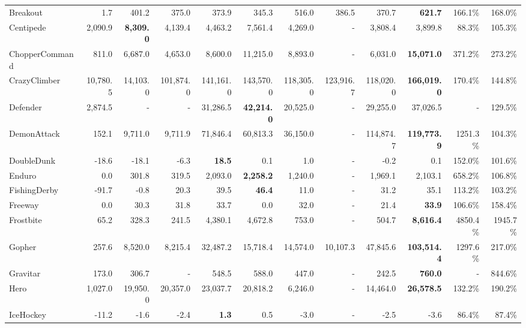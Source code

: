 \documentclass[journal]{IEEEtran}
\begin{document}
\begin{table*}[htbp]
{\begin{tabular}{lrrrrrrrrrrr}
			Breakout & 1.7   & 401.2 & 375.0 & 373.9 & 345.3 & 516.0 & 386.5 & 370.7 & \textbf{       621.7 } & 166.1\% & 168.0\% \\
			Centipede & 2,090.9 & \textbf{8,309.0} & 4,139.4 & 4,463.2 & 7,561.4 & 4,269.0 & -     & 3,808.4 &      3,899.8  & 88.3\% & 105.3\% \\
			ChopperCommand & 811.0 & 6,687.0 & 4,653.0 & 8,600.0 & 11,215.0 & 8,893.0 & -     & 6,031.0 & \textbf{   15,071.0 } & 371.2\% & 273.2\% \\
			CrazyClimber & 10,780.5 & 14,103.0 & 101,874.0 & 141,161.0 & 143,570.0 & 118,305.0 & 123,916.7 & 118,020.0 & \textbf{ 166,019.0 } & 170.4\% & 144.8\% \\
			Defender & 2,874.5 & -     & -     & 31,286.5 & \textbf{42,214.0} & 20,525.0 & -     & 29,255.0 &     37,026.5  & -     & 129.5\% \\
			DemonAttack & 152.1 & 9,711.0 & 9,711.9 & 71,846.4 & 60,813.3 & 36,150.0 & -     & 114,874.7 & \textbf{ 119,773.9 } & 1251.3\% & 104.3\% \\
			DoubleDunk & -18.6 & -18.1 & -6.3  & \textbf{18.5} & 0.1   & 1.0   & -     & -0.2  &             0.1  & 152.0\% & 101.6\% \\
			Enduro & 0.0   & 301.8 & 319.5 & 2,093.0 & \textbf{2,258.2} & 1,240.0 & -     & 1,969.1 &      2,103.1  & 658.2\% & 106.8\% \\
			FishingDerby & -91.7 & -0.8  & 20.3  & 39.5  & \textbf{46.4} & 11.0  & -     & 31.2  &           35.1  & 113.2\% & 103.2\% \\
			Freeway & 0.0   & 30.3  & 31.8  & 33.7  & 0.0   & 32.0  & -     & 21.4  & \textbf{         33.9 } & 106.6\% & 158.4\% \\
			Frostbite & 65.2  & 328.3 & 241.5 & 4,380.1 & 4,672.8 & 753.0 & -     & 504.7 & \textbf{     8,616.4 } & 4850.4\% & 1945.7\% \\
			Gopher & 257.6 & 8,520.0 & 8,215.4 & 32,487.2 & 15,718.4 & 14,574.0 & 10,107.3 & 47,845.6 & \textbf{ 103,514.4 } & 1297.6\% & 217.0\% \\
			Gravitar & 173.0 & 306.7 & -     & 548.5 & 588.0 & 447.0 & -     & 242.5 & \textbf{       760.0 } & -     & 844.6\% \\
			Hero  & 1,027.0 & 19,950.0 & 20,357.0 & 23,037.7 & 20,818.2 & 6,246.0 & -     & 14,464.0 & \textbf{   26,578.5 } & 132.2\% & 190.2\% \\
			IceHockey & -11.2 & -1.6  & -2.4  & \textbf{1.3} & 0.5   & -3.0  & -     & -2.5  &           -3.6  & 86.4\% & 87.4\% \\

\end{tabular}}
\end{table*}
\end{document}
